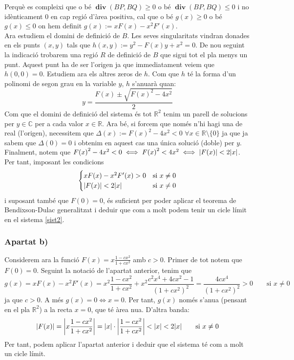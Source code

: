 \documentclass{article}
\newcommand{\CC}{\ensuremath{\mathbb{C}}}
\newcommand{\RR}{\ensuremath{\mathbb{R}}}
\renewcommand{\div}{\operatorname{\mathbf{div}}} %
\begin{document}
Perquè es compleixi que o bé $\div(BP,BQ)\geq 0$ o bé $\div(BP,BQ)\leq 0$ i no idènticament 0 en cap regió d'àrea positiva, cal que o bé $g(x)\geq 0$ o bé $g(x)\leq 0$ on hem definit $g(x):=xF(x)-x^2F'(x)$.
\\
Ara estudiem el domini de definició de $B$. Les seves singularitats vindran donades en els punts $(x,y)$ tals que $h(x,y):=y^2-F(x)y+x^2=0$. De nou seguint la indicació trobarem una regió $R$ de definició de $B$ que sigui tot el pla menys un punt. Aquest punt ha de ser l'origen ja que immediatament veiem que $h(0,0)=0$. Estudiem ara els altres zeros de $h$. Com que $h$ té la forma d'un polinomi de segon grau en la variable $y$, $h$ s'anu\lgem arà quan: $$y=\frac{F(x)\pm\sqrt{{F(x)}^2-4x^2}}{2}$$ Com que el domini de definició del sistema és tot $\RR^2$ tenim un parell de solucions per $y\in\CC$ per a cada valor $x\in\RR$. Ara bé, si forcem que només n'hi hagi una de real (l'origen), necessitem que $\Delta(x):={F(x)}^2-4x^2<0$ $\forall x\in \RR\setminus\{0\}$ ja que ja sabem que $\Delta(0)=0$ i obtenim en aquest cas una única solució (doble) per $y$. Finalment, notem que ${F(x)}^2-4x^2<0\iff {F(x)}^2<4x^2\iff \abs{F(x)}<2\abs{x}$. Per tant, imposant les condicions
$$
  \begin{cases}
    xF(x)-x^2F'(x)> 0   & \text{si } x\ne 0 \\
    \abs{F(x)}<2\abs{x} & \text{si } x\ne 0
  \end{cases}
$$
i suposant també que $F(0)=0$, és suficient per poder aplicar el teorema de Bendixson-Dulac generalitzat i deduir que com a molt podem tenir un cicle límit en el sistema \eqref{sist2}.
\subsubsection*{Apartat b)}
Considerem ara la funció $F(x)=x\frac{1-cx^2}{1+cx^2}$ amb $c>0$. Primer de tot notem que $F(0)=0$. Seguint la notació de l'apartat anterior, tenim que $$g(x)=xF(x)-x^2F'(x)=x^2\frac{1-cx^2}{1+cx^2}+x^2\frac{c^2x^4+4cx^2-1}{{(1+cx^2)}^2}=\frac{4cx^4}{{(1+cx^2)}^2}> 0\qquad\text{si }x\ne 0$$ ja que $c>0$. A més $g(x)=0\iff x=0$. Per tant, $g(x)$ només s'anu\lgem a (pensant en el pla $\RR^2$) a la recta $x=0$, que té àrea nu\lgem a. D'altra banda:
$$\abs{F(x)}=\abs{x\frac{1-cx^2}{1+cx^2}}=\abs{x}\cdot\abs{\frac{1-cx^2}{1+cx^2}}<\abs{x}<2\abs{x}\qquad\text{si }x\ne 0$$
Per tant, podem aplicar l'apartat anterior i deduir que el sistema té com a molt un cicle límit.
\end{document}
